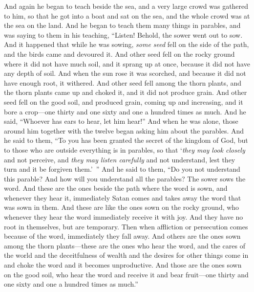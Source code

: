 \begin{biblechapter} %
 And again he began to teach beside the sea, and a very large crowd was gathered to him, so that he got into a boat and sat on the sea, and the whole crowd was at the sea on the land.
\verse And he began to teach them many things in parables, and was saying to them in his teaching,
\verse “Listen! Behold, the sower went out to sow.
\verse And it happened that while he was sowing, \textit{some seed} fell on the side of the path, and the birds came and devoured it.
\verse And other seed fell on the rocky ground where it did not have much soil, and it sprang up at once, because it did not have any depth of soil.
\verse And when the sun rose it was scorched, and because it did not have enough root, it withered.
\verse And other seed fell among the thorn plants, and the thorn plants came up and choked it, and it did not produce grain.
\verse And other seed fell on the good soil, and produced grain, coming up and increasing, and it bore a crop—one thirty and one sixty and one a hundred times as much.
\verse And he said, “Whoever has ears to hear, let him hear!”
 And when he was alone, those around him together with the twelve began asking him about the parables.
\verse And he said to them, “To you has been granted the secret of the kingdom of God, but to those who are outside everything is in parables,
\verse so that ‘\textit{they may look closely} and not perceive, 
and \textit{they may listen carefully} and not understand, 
lest they turn and it be forgiven them.’ ”
 And he said to them, “Do you not understand this parable? And how will you understand all the parables?
\verse The sower sows the word.
\verse And these are the ones beside the path where the word is sown, and whenever they hear it, immediately Satan comes and takes away the word that was sown in them.
\verse And these are like the ones sown on the rocky ground, who whenever they hear the word immediately receive it with joy.
\verse And they have no root in themselves, but are temporary. Then when affliction or persecution comes because of the word, immediately they fall away.
\verse And others are the ones sown among the thorn plants—these are the ones who hear the word,
\verse and the cares of the world and the deceitfulness of wealth and the desires for other things come in and choke the word and it becomes unproductive.
\verse And those are the ones sown on the good soil, who hear the word and receive it and bear fruit—one thirty and one sixty and one a hundred times as much.”

\end{biblechapter}
